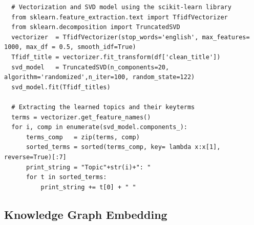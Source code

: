 \begin{lstlisting}
  # Vectorization and SVD model using the scikit-learn library
  from sklearn.feature_extraction.text import TfidfVectorizer
  from sklearn.decomposition import TruncatedSVD
  vectorizer  = TfidfVectorizer(stop_words='english', max_features= 1000, max_df = 0.5, smooth_idf=True)
  Tfidf_title = vectorizer.fit_transform(df['clean_title'])
  svd_model   = TruncatedSVD(n_components=20, algorithm='randomized',n_iter=100, random_state=122)
  svd_model.fit(Tfidf_titles)  

  # Extracting the learned topics and their keyterms
  terms = vectorizer.get_feature_names()
  for i, comp in enumerate(svd_model.components_):
      terms_comp   = zip(terms, comp)
      sorted_terms = sorted(terms_comp, key= lambda x:x[1], reverse=True)[:7]
      print_string = "Topic"+str(i)+": "
      for t in sorted_terms:
          print_string += t[0] + " "
  \end{lstlisting}

 \pagebreak
\subsection{Knowledge Graph Embedding}
\label{app:kgecase}

